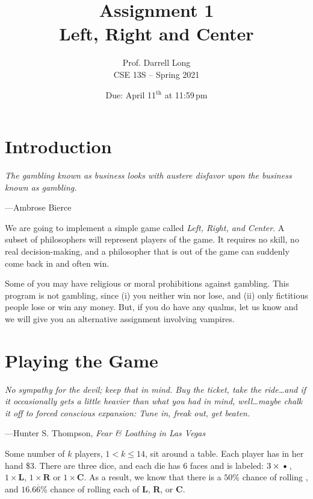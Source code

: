 \documentclass{article}
\title{Assignment 1 \\ Left, Right and Center}
\author{Prof. Darrell Long \\
CSE 13S -- Spring 2021}
\date{Due: April 11$^\text{th}$ at 11:59\,pm}
\begin{document}
\maketitle


\section{Introduction}
\textwidth
\epigraph{\emph{The gambling known as business looks with austere disfavor
upon the business known as gambling.}}{---Ambrose Bierce}

\noindent We are going to implement a simple game called \emph{Left, Right, and Center}.
A subset of philosophers will represent players of the game.
It requires no skill, no real decision-making, and a philosopher that is out of the
game can suddenly come back in and often win.

Some of you may have religious or moral prohibitions against gambling. This
program is not gambling, since (i) you neither win nor lose, and (ii) only
fictitious people lose or win any money. But, if you do have any qualms, let
us know and we will give you an alternative assignment involving vampires.

\section{Playing the Game}
\textwidth
\epigraph{\emph{No sympathy for the devil; keep that in mind. Buy
the ticket, take the ride\ldots and if it occasionally gets a little
heavier than what you had in mind, well\ldots maybe chalk it off
to forced conscious expansion: Tune in, freak out, get beaten.}}{---Hunter
S. Thompson, \emph{Fear \& Loathing in Las Vegas}}\noindent

Some number of $k$ players, $1 < k \le 14$, sit around a table.
Each player has in her hand \$3. There are three dice, and each die
has $6$ faces and is labeled: $3 \times \textbf{\textbullet}$, $1
\times \textbf{L}$, $1 \times \textbf{R}$ or $1 \times \textbf{C}$.
As a result, we know that there is a $50$\% chance of rolling
\textbf{\textbullet}, and $16.6\overline{6}$\% chance of rolling
each of \textbf{L}, \textbf{R}, or \textbf{C}.
\end{document}
